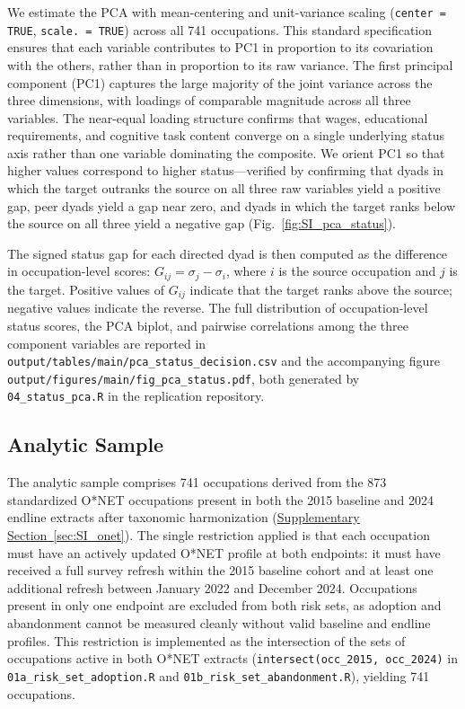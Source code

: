\documentclass[11pt, letterpaper]{article} %
\begin{document}
We estimate the PCA with mean-centering and unit-variance scaling (\texttt{center = TRUE}, \texttt{scale. = TRUE}) across all 741 occupations. This standard specification ensures that each variable contributes to PC1 in proportion to its covariation with the others, rather than in proportion to its raw variance. The first principal component (PC1) captures the large majority of the joint variance across the three dimensions, with loadings of comparable magnitude across all three variables. The near-equal loading structure confirms that wages, educational requirements, and cognitive task content converge on a single underlying status axis rather than one variable dominating the composite. We orient PC1 so that higher values correspond to higher status---verified by confirming that dyads in which the target outranks the source on all three raw variables yield a positive gap, peer dyads yield a gap near zero, and dyads in which the target ranks below the source on all three yield a negative gap (Fig.~\ref{fig:SI_pca_status}).
 
The signed status gap for each directed dyad is then computed as the difference in occupation-level scores: $G_{ij} = \sigma_j - \sigma_i$, where $i$ is the source occupation and $j$ is the target. Positive values of $G_{ij}$ indicate that the target ranks above the source; negative values indicate the reverse. The full distribution of occupation-level status scores, the PCA biplot, and pairwise correlations among the three component variables are reported in \texttt{output/tables/main/pca\_status\_decision.csv} and the accompanying figure \texttt{output/figures/main/fig\_pca\_status.pdf}, both generated by \texttt{04\_status\_pca.R} in the replication repository.



\subsection{Analytic Sample}
\label{sec:SI_sample}
 
The analytic sample comprises 741 occupations derived from the 873 standardized O*NET occupations present in both the 2015 baseline and 2024 endline extracts after taxonomic harmonization (\hyperref[sec:SI_onet]{Supplementary Section~\ref*{sec:SI_onet}}). The single restriction applied is that each occupation must have an actively updated O*NET profile at both endpoints: it must have received a full survey refresh within the 2015 baseline cohort and at least one additional refresh between January 2022 and December 2024. Occupations present in only one endpoint are excluded from both risk sets, as adoption and abandonment cannot be measured cleanly without valid baseline and endline profiles. This restriction is implemented as the intersection of the sets of occupations active in both O*NET extracts (\texttt{intersect(occ\_2015, occ\_2024)} in \texttt{01a\_risk\_set\_adoption.R} and \texttt{01b\_risk\_set\_abandonment.R}), yielding 741 occupations.
 
\end{document}
